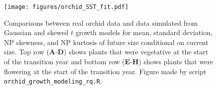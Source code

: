 \documentclass[12pt]{article}
\begin{document}
\begin{figure}[h!]
	\centering
	\texttt{[image: figures/orchid\_SST\_fit.pdf]}
	\caption{Comparisons between real orchid data and data simulated from Gaussian and skewed $t$ growth models for mean, standard deviation, NP skewness, and NP kurtosis of future size conditional on current size. Top row (\textbf{A}-\textbf{D}) shows plants that were vegetative at the start of the transition year and bottom row (\textbf{E}-\textbf{H}) shows plants that were flowering at the start of the transition year. Figure made by script \texttt{orchid\_growth\_modeling\_rq.R}.}
	\label{fig:orchid_SST_fit}
\end{figure} 
\end{document}

